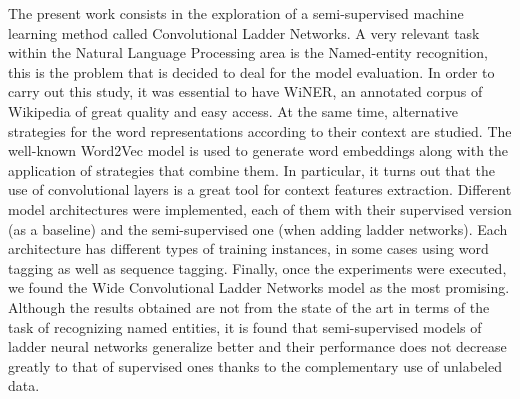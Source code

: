 \documentclass[12pt]{book}
\begin{document}
\vspace{10mm}

The present work consists in the exploration of a semi-supervised machine learning method called Convolutional Ladder Networks. A very relevant task within the Natural Language Processing area is the Named-entity recognition, this is the problem that is decided to deal for the model evaluation. In order to carry out this study, it was essential to have WiNER, an annotated corpus of Wikipedia of great quality and easy access. At the same time, alternative strategies for the word representations according to their context are studied. The well-known Word2Vec model is used to generate word embeddings along with the application of strategies that combine them. In particular, it turns out that the use of convolutional layers is a great tool for context features extraction. Different model architectures were implemented, each of them with their supervised version (as a baseline) and the semi-supervised one (when adding ladder networks). Each architecture has different types of training instances, in some cases using word tagging as well as sequence tagging. Finally, once the experiments were executed, we found the Wide Convolutional Ladder Networks model as the most promising. Although the results obtained are not from the state of the art in terms of the task of recognizing named entities, it is found that semi-supervised models of ladder neural networks generalize better and their performance does not decrease greatly to that of supervised ones thanks to the complementary use of unlabeled data.


\tableofcontents


\mainmatter %
\pagestyle{headings}



%
\end{document}
